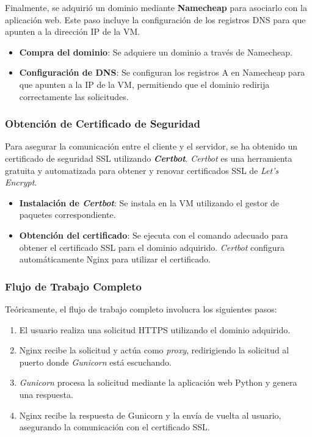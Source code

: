 Finalmente, se adquirió un dominio mediante \textbf{Namecheap} para asociarlo con la aplicación web. Este paso incluye la configuración de los registros DNS para que apunten a la dirección IP de la VM.

\begin{itemize}
	\item \textbf{Compra del dominio}: Se adquiere un dominio a través de Namecheap.
	\item \textbf{Configuración de DNS}: Se configuran los registros A en Namecheap para que apunten a la IP de la VM, permitiendo que el dominio redirija correctamente las solicitudes.
\end{itemize}

\subsubsection{Obtención de Certificado de Seguridad}

Para asegurar la comunicación entre el cliente y el servidor, se ha obtenido un certificado de seguridad SSL utilizando \textbf{\textit{Certbot}}. \textit{Certbot} es una herramienta gratuita y automatizada para obtener y renovar certificados SSL de \textit{Let's Encrypt}.

\begin{itemize}
	\item \textbf{Instalación de \textit{Certbot}}: Se instala en la VM utilizando el gestor de paquetes correspondiente.
	\item \textbf{Obtención del certificado}: Se ejecuta con el comando adecuado para obtener el certificado SSL para el dominio adquirido. \textit{Certbot} configura automáticamente Nginx para utilizar el certificado.
\end{itemize}


\subsubsection{Flujo de Trabajo Completo}

Teóricamente, el flujo de trabajo completo involucra los siguientes pasos:

\begin{enumerate}
	\item El usuario realiza una solicitud HTTPS utilizando el dominio adquirido.
	\item Nginx recibe la solicitud y actúa como \textit{proxy}, redirigiendo la solicitud al puerto donde \textit{Gunicorn} está escuchando.
	\item \textit{Gunicorn} procesa la solicitud mediante la aplicación web Python y genera una respuesta.
	\item Nginx recibe la respuesta de Gunicorn y la envía de vuelta al usuario, asegurando la comunicación con el certificado SSL.
\end{enumerate}

